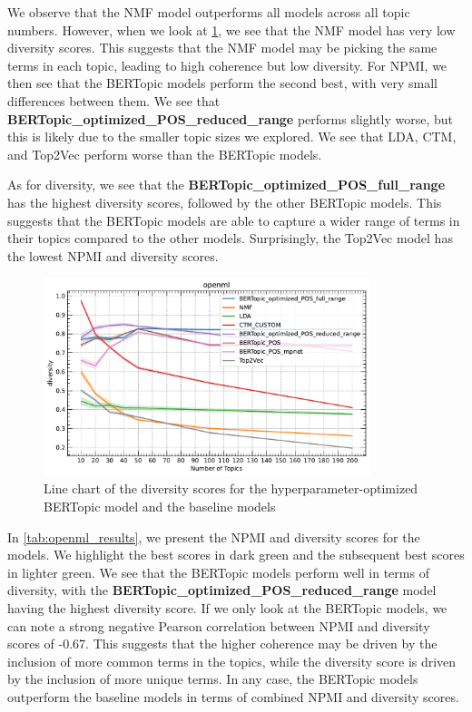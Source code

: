 We observe that the NMF model outperforms all models across all topic numbers. However, when we look at \cref{fig:openml_diversity}, we see that the NMF model has very low diversity scores. This suggests that the NMF model may be picking the same terms in each topic, leading to high coherence but low diversity. For NPMI, we then see that the BERTopic models perform the second best, with very small differences between them. We see that \textbf{BERTopic\_optimized\_POS\_reduced\_range} performs slightly worse, but this is likely due to the smaller topic sizes we explored. We see that LDA, CTM, and Top2Vec perform worse than the BERTopic models.

As for diversity, we see that the \textbf{BERTopic\_optimized\_POS\_full\_range} has the highest diversity scores, followed by the other BERTopic models. This suggests that the BERTopic models are able to capture a wider range of terms in their topics compared to the other models. Surprisingly, the Top2Vec model has the lowest NPMI and diversity scores.

\begin{figure}[h]
    \centering
    \includegraphics[width=0.85\textwidth]{figures/openml_diversity.pdf}
    \caption{Line chart of the diversity scores for the hyperparameter-optimized BERTopic model and the baseline models}
    \label{fig:openml_diversity}
\end{figure}

In \cref{tab:openml_results}, we present the NPMI and diversity scores for the models. We highlight the best scores in dark green and the subsequent best scores in lighter green. We see that the BERTopic models perform well in terms of diversity, with the \textbf{BERTopic\_optimized\_POS\_reduced\_range} model having the highest diversity score. If we only look at the BERTopic models, we can note a strong negative Pearson correlation between NPMI and diversity scores of -0.67. This suggests that the higher coherence may be driven by the inclusion of more common terms in the topics, while the diversity score is driven by the inclusion of more unique terms. In any case, the BERTopic models outperform the baseline models in terms of combined NPMI and diversity scores.

